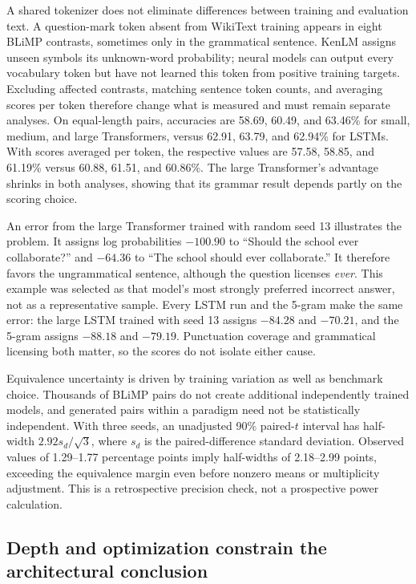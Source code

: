 \documentclass[10pt]{article}
\begin{document}
A shared tokenizer does not eliminate differences between training and evaluation text. A question-mark token absent from WikiText training appears in eight BLiMP contrasts, sometimes only in the grammatical sentence. KenLM assigns unseen symbols its unknown-word probability; neural models can output every vocabulary token but have not learned this token from positive training targets. Excluding affected contrasts, matching sentence token counts, and averaging scores per token therefore change what is measured and must remain separate analyses. On equal-length pairs, accuracies are 58.69, 60.49, and 63.46\% for small, medium, and large Transformers, versus 62.91, 63.79, and 62.94\% for LSTMs. With scores averaged per token, the respective values are 57.58, 58.85, and 61.19\% versus 60.88, 61.51, and 60.86\%. The large Transformer's advantage shrinks in both analyses, showing that its grammar result depends partly on the scoring choice.

An error from the large Transformer trained with random seed 13 illustrates the problem. It assigns log probabilities $-100.90$ to ``Should the school ever collaborate?'' and $-64.36$ to ``The school should ever collaborate.'' It therefore favors the ungrammatical sentence, although the question licenses \emph{ever}. This example was selected as that model's most strongly preferred incorrect answer, not as a representative sample. Every LSTM run and the 5-gram make the same error: the large LSTM trained with seed 13 assigns $-84.28$ and $-70.21$, and the 5-gram assigns $-88.18$ and $-79.19$. Punctuation coverage and grammatical licensing both matter, so the scores do not isolate either cause.

Equivalence uncertainty is driven by training variation as well as benchmark choice. Thousands of BLiMP pairs do not create additional independently trained models, and generated pairs within a paradigm need not be statistically independent. With three seeds, an unadjusted 90\% paired-$t$ interval has half-width $2.92s_d/\sqrt{3}$, where $s_d$ is the paired-difference standard deviation. Observed values of 1.29--1.77 percentage points imply half-widths of 2.18--2.99 points, exceeding the equivalence margin even before nonzero means or multiplicity adjustment. This is a retrospective precision check, not a prospective power calculation.

\subsection{Depth and optimization constrain the architectural conclusion}
\end{document}
